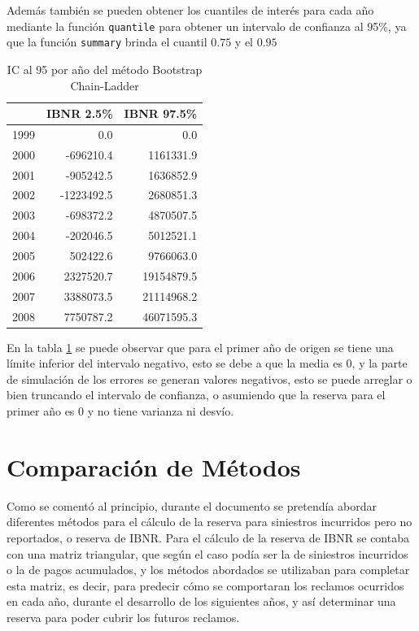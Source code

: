 \documentclass[
  12pt,
]{article}
\begin{document}
Además también se pueden obtener los cuantiles de interés para cada año
mediante la función \texttt{quantile} para obtener un intervalo de
confianza al 95\%, ya que la función \texttt{summary} brinda el cuantil
\(0.75\) y el \(0.95\)

\begin{table}[ht]
\centering
\caption{IC al 95 por año del método Bootstrap Chain-Ladder} 
\label{quantile_boot}
\begin{tabular}{lrr}
  \hline
 & IBNR 2.5\% & IBNR 97.5\% \\ 
  \hline
1999 & 0.0 & 0.0 \\ 
  2000 & -696210.4 & 1161331.9 \\ 
  2001 & -905242.5 & 1636852.9 \\ 
  2002 & -1223492.5 & 2680851.3 \\ 
  2003 & -698372.2 & 4870507.5 \\ 
  2004 & -202046.5 & 5012521.1 \\ 
  2005 & 502422.6 & 9766063.0 \\ 
  2006 & 2327520.7 & 19154879.5 \\ 
  2007 & 3388073.5 & 21114968.2 \\ 
  2008 & 7750787.2 & 46071595.3 \\ 
   \hline
\end{tabular}
\end{table}

En la tabla \ref{quantile_boot} se puede observar que para el primer año
de origen se tiene una límite inferior del intervalo negativo, esto se
debe a que la media es 0, y la parte de simulación de los errores se
generan valores negativos, esto se puede arreglar o bien truncando el
intervalo de confianza, o asumiendo que la reserva para el primer año es
0 y no tiene varianza ni desvío.

\section{Comparación de Métodos}\label{comparaciuxf3n-de-muxe9todos}

Como se comentó al principio, durante el documento se pretendía abordar
diferentes métodos para el cálculo de la reserva para siniestros
incurridos pero no reportados, o reserva de IBNR. Para el cálculo de la
reserva de IBNR se contaba con una matriz triangular, que según el caso
podía ser la de siniestros incurridos o la de pagos acumulados, y los
métodos abordados se utilizaban para completar esta matriz, es decir,
para predecir cómo se comportaran los reclamos ocurridos en cada año,
durante el desarrollo de los siguientes años, y así determinar una
reserva para poder cubrir los futuros reclamos.
\end{document}
